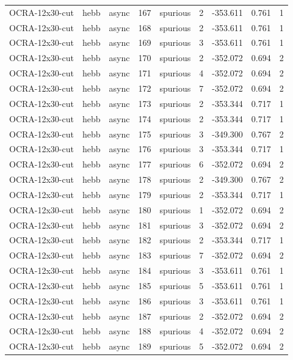 \begin{tabular}{lllrlrrrr}
OCRA-12x30-cut & hebb & async & 167 & spurious & 2 & -353.611 & 0.761 & 1 \\
OCRA-12x30-cut & hebb & async & 168 & spurious & 2 & -353.611 & 0.761 & 1 \\
OCRA-12x30-cut & hebb & async & 169 & spurious & 3 & -353.611 & 0.761 & 1 \\
OCRA-12x30-cut & hebb & async & 170 & spurious & 2 & -352.072 & 0.694 & 2 \\
OCRA-12x30-cut & hebb & async & 171 & spurious & 4 & -352.072 & 0.694 & 2 \\
OCRA-12x30-cut & hebb & async & 172 & spurious & 7 & -352.072 & 0.694 & 2 \\
OCRA-12x30-cut & hebb & async & 173 & spurious & 2 & -353.344 & 0.717 & 1 \\
OCRA-12x30-cut & hebb & async & 174 & spurious & 2 & -353.344 & 0.717 & 1 \\
OCRA-12x30-cut & hebb & async & 175 & spurious & 3 & -349.300 & 0.767 & 2 \\
OCRA-12x30-cut & hebb & async & 176 & spurious & 3 & -353.344 & 0.717 & 1 \\
OCRA-12x30-cut & hebb & async & 177 & spurious & 6 & -352.072 & 0.694 & 2 \\
OCRA-12x30-cut & hebb & async & 178 & spurious & 2 & -349.300 & 0.767 & 2 \\
OCRA-12x30-cut & hebb & async & 179 & spurious & 2 & -353.344 & 0.717 & 1 \\
OCRA-12x30-cut & hebb & async & 180 & spurious & 1 & -352.072 & 0.694 & 2 \\
OCRA-12x30-cut & hebb & async & 181 & spurious & 3 & -352.072 & 0.694 & 2 \\
OCRA-12x30-cut & hebb & async & 182 & spurious & 2 & -353.344 & 0.717 & 1 \\
OCRA-12x30-cut & hebb & async & 183 & spurious & 7 & -352.072 & 0.694 & 2 \\
OCRA-12x30-cut & hebb & async & 184 & spurious & 3 & -353.611 & 0.761 & 1 \\
OCRA-12x30-cut & hebb & async & 185 & spurious & 5 & -353.611 & 0.761 & 1 \\
OCRA-12x30-cut & hebb & async & 186 & spurious & 3 & -353.611 & 0.761 & 1 \\
OCRA-12x30-cut & hebb & async & 187 & spurious & 2 & -352.072 & 0.694 & 2 \\
OCRA-12x30-cut & hebb & async & 188 & spurious & 4 & -352.072 & 0.694 & 2 \\
OCRA-12x30-cut & hebb & async & 189 & spurious & 5 & -352.072 & 0.694 & 2 \\

\end{tabular}
